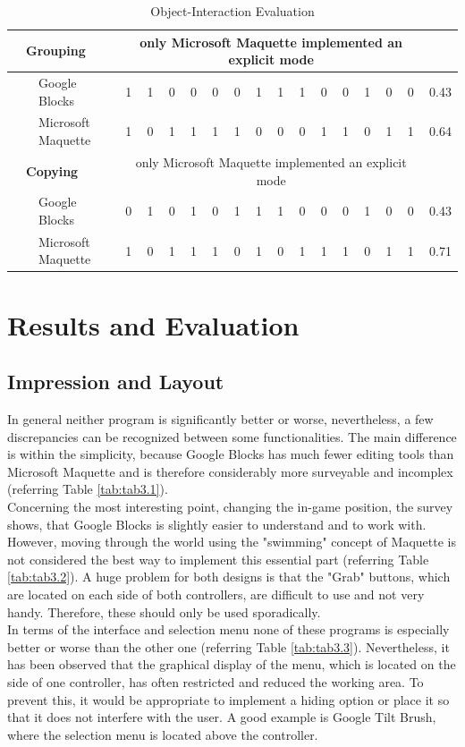 \documentclass{report}
\begin{document}
\begin{table}[H]
\begin{tabular}{@{}|lll|llllllllllllll|r|@{}}
				& \multicolumn{2}{l|}{\textbf{Grouping}} & \multicolumn{14}{c|}{\small{only Microsoft Maquette implemented an explicit mode}} &\\ \hline
				& & Google Blocks & 1 & 1 & 0 & 0 & 0 & 0& 1 & 1 & 1 & 0 & 0 & 1 & 0 & 0 & 0.43 \\
				& & Microsoft Maquette & 1 & 0 & 1 & 1 & 1 & 1 & 0 & 0 & 0 & 1 & 1 & 0 & 1 & 1 & 0.64 \\ \hline				
				
				& \multicolumn{2}{l|}{\textbf{Copying}} & \multicolumn{14}{c|}{\small{only Microsoft Maquette implemented an explicit mode}} &\\ \hline
				& & Google Blocks & 0 & 1 & 0 & 1 & 0 & 1 & 1 & 1 & 0 & 0 & 0 & 1 & 0 & 0 & 0.43 \\
				& & Microsoft Maquette & 1 & 0 & 1 & 1 & 1 & 0 & 1 & 0 & 1 & 1 & 1 & 0 & 1 & 1 & 0.71 \\ \hline
			\end{tabular}
			\caption{Object-Interaction Evaluation}
			\label{tab:tab3.4}					
		\end{table}
			
	\section{Results and Evaluation}
		\vspace{0.5cm}
		\subsection{Impression and Layout}
			In general neither program is significantly better or worse, nevertheless, a few discrepancies can be recognized between some functionalities. The main difference is within the simplicity, because Google Blocks has much fewer editing tools than Microsoft Maquette and is therefore considerably more surveyable and incomplex (referring Table \ref{tab:tab3.1}). \\
			Concerning the most interesting point, changing the in-game position, the survey shows, that Google Blocks is slightly easier to understand and to work with. However, moving through the world using the "swimming" concept of Maquette is not considered the best way to implement this essential part (referring Table \ref{tab:tab3.2}). A huge problem for both designs is that the "Grab" buttons, which are located on each side of both controllers, are difficult to use and not very handy. Therefore, these should only be used sporadically. \\
			In terms of the interface and selection menu none of these programs is especially better or worse than the other one (referring Table \ref{tab:tab3.3}). Nevertheless, it has been observed that the graphical display of the menu, which is located on the side of one controller, has often restricted and reduced the working area. To prevent this, it would be appropriate to implement a hiding option or place it so that it does not interfere with the user. A good example is Google Tilt Brush, where the selection menu is located above the controller. \\
\end{document}
